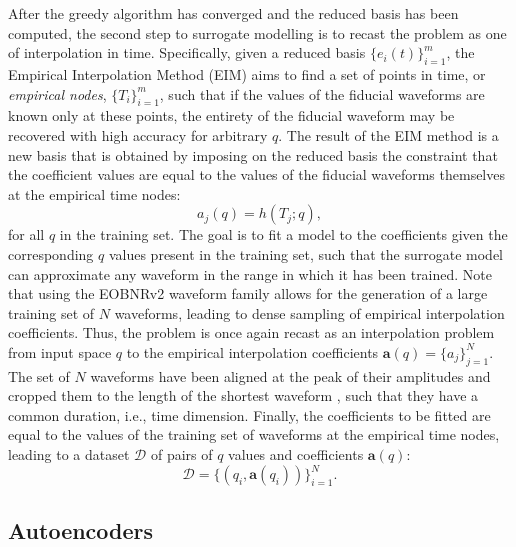 \documentclass[preprint,12pt]{elsarticle}
\begin{document}
After the greedy algorithm has converged and the reduced basis has been computed, the second step to surrogate modelling is to recast the problem as one of interpolation in time. Specifically, given a reduced basis $\{e_i(t)\}_{i=1}^{m}$, the Empirical Interpolation Method (EIM) aims to find a set of points in time, or \emph{empirical nodes}, $\{ T_i \}_{i=1}^{m}$, such that if the values of the fiducial waveforms are known only at these points, the entirety of the fiducial waveform may be recovered with high accuracy for arbitrary $q$. The result of the EIM method is a new basis that is obtained by imposing on the reduced basis the constraint that the coefficient values are equal to the values of the fiducial waveforms themselves at the empirical time nodes:
\begin{equation}
    a_j(q) = h(T_j;q),
\end{equation}
for all $q$ in the training set. The goal is to fit a model to the coefficients given the corresponding $q$ values present in the training set, such that the surrogate model can approximate any waveform in the range in which it has been trained. Note that using the EOBNRv2 waveform family allows for the generation of a large training set of $N$ waveforms, leading to dense sampling of empirical interpolation coefficients. Thus, the problem is once again recast as an interpolation problem from input space $q$ to the empirical interpolation coefficients $\mathbf{a}(q)=\{a_j\}_{j=1}^{N}$. The set of $N$ waveforms have been aligned at the peak of their amplitudes and cropped them to the length of the shortest waveform \cite{khan2021gravitational,field2014fast}, such that they have a common duration, i.e., time dimension. Finally, the coefficients to be fitted are equal to the values of the training set of waveforms at the empirical time nodes, leading to a dataset $\mathcal{D}$ of pairs of $q$ values and coefficients $\mathbf{a}(q)$:
\begin{equation}
    \mathcal{D} = \{ (q_i, \mathbf{a}(q_i)) \}_{i=1}^{N}.
\end{equation}





\subsection{Autoencoders}
\end{document}
